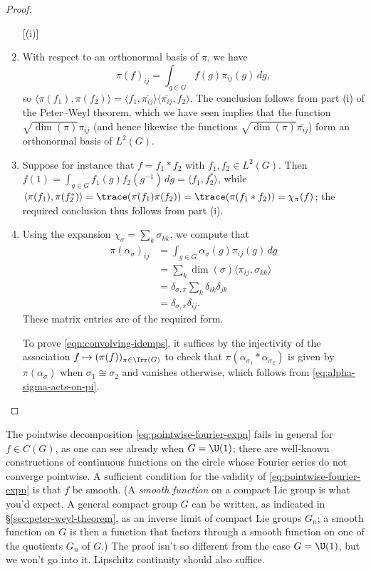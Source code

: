 \documentclass[reqno]{amsart} 
\begin{document}
\begin{proof}
  \begin{enumerate}
[(i)]
  \item With respect to an orthonormal basis of $\pi$, we have
    \begin{equation}\label{eq:}
      \pi(f)_{i j}
      = \int_{g \in G}
      f(g) \pi_{i j}(g) \, d g,
    \end{equation}
    so $\langle \pi(f_1), \pi(f_2) \rangle = \langle f_1, \overline{\pi_{i j}} \rangle \langle \overline{\pi_{i j}}, f_2 \rangle$.  The conclusion follows from part (i) of the Peter--Weyl theorem, which we have seen implies that the function $\sqrt{\dim(\pi)} \pi_{i j}$ (and hence likewise the functions $\sqrt{\dim(\pi)} \overline{\pi_{i j}}$) form an orthonormal basis of $L^2(G)$.
  \item Suppose for instance that $f = f_1 \ast f_2$ with $f_1, f_2 \in L^2(G)$.  Then $f(1) = \int_{g \in G} f_1(g) f_2(g^{-1}) \, d g = \langle f_1, f_2^* \rangle$, while $\langle \pi(f_1), \pi(f_2^*) \rangle = \trace(\pi(f_1) \pi(f_2)) = \trace(\pi(f_1 \ast f_2)) = \chi_\pi(f)$; the required conclusion thus follows from part (i).
  \item Using the expansion $\chi_\sigma = \sum_{k } \sigma_{k k}$, we compute that
    \begin{align*}
      \pi(\alpha_\sigma)_{i j}
      &=
        \int_{g \in G}
        \alpha_\sigma(g) \pi_{i j}(g) \, d g
      \\
      &=
        \sum_k
        \dim(\sigma)
        \langle \pi_{i j}, \sigma_{k k} \rangle
      \\
      &= \delta_{\sigma,\pi}
        \sum_k
        \delta_{i k}
        \delta_{j k}
      \\
      &= \delta_{\sigma,\pi}
        \delta_{i j}.
    \end{align*}
    These matrix entries are of the required form.

    To prove \eqref{eqn:convolving-idemps}, it suffices by the injectivity of the association $f \mapsto (\pi(f))_{\pi \in \Irr(G)}$ to check that $\pi(\alpha_{\sigma_1} \ast \alpha_{\sigma_2})$ is given by $\pi(\alpha_\sigma)$ when $\sigma_1 \cong \sigma_2$ and vanishes otherwise, which follows from \eqref{eq:alpha-sigma-acts-on-pi}.
  \end{enumerate}
\end{proof}

The pointwise decomposition \eqref{eq:pointwise-fourier-expn} fails in general for $f \in C(G)$, as one can see already when $G = \U(1)$; there are well-known constructions of continuous functions on the circle whose Fourier series do not converge pointwise.  A sufficient condition for the validity of \eqref{eq:pointwise-fourier-expn} is that $f$ be smooth.  (A \emph{smooth function} on a compact Lie group is what you'd expect.  A general compact group $G$ can be written, as indicated in \S\ref{sec:peter-weyl-theorem}, as an inverse limit of compact Lie groups $G_n$; a smooth function on $G$ is then a function that factors through a smooth function on one of the quotients $G_n$ of $G$.)  The proof isn't so different from the case $G = \U(1)$, but we won't go into it.  Lipschitz continuity should also suffice.
\end{document}
